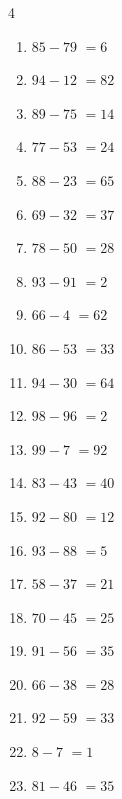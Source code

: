 \begin{multicols}{4}
\begin{enumerate}
  \item $85-79$
        $=6$

  \item $94-12$
        $=82$

  \item $89-75$
        $=14$

  \item $77-53$
        $=24$

  \item $88-23$
        $=65$

  \item $69-32$
        $=37$

\columnbreak %

  \item $78-50$
        $=28$

  \item $93-91$
        $=2$

  \item $66-4$
        $=62$

  \item $86-53$
        $=33$

  \item $94-30$
        $=64$

  \item $98-96$
        $=2$

  \item $99-7$
        $=92$

  \item $83-43$
        $=40$

  \item $92-80$
        $=12$

  \item $93-88$
        $=5$

  \item $58-37$
        $=21$

  \item $70-45$
        $=25$

  \item $91-56$
        $=35$

  \item $66-38$
        $=28$

  \item $92-59$
        $=33$

  \item $8-7$
        $=1$

  \item $81-46$
        $=35$


\end{enumerate}
\end{multicols}
